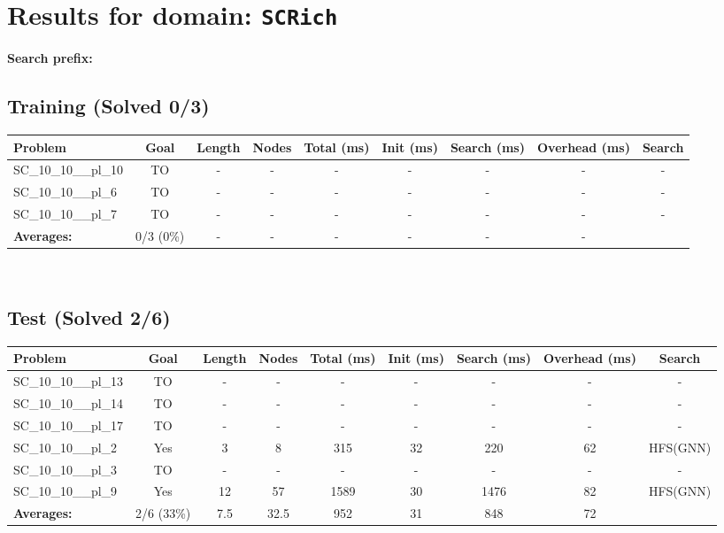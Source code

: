 \documentclass{article}
\begin{document}
\section*{Results for domain: \texttt{SCRich}}
\textbf{Search prefix:} 
\\[0.5cm]
\subsection*{Training (Solved 0/3)}
\begin{tabular}{lcccccccc}
\toprule
Problem & Goal & Length & Nodes & Total (ms) & Init (ms) & Search (ms) & Overhead (ms) & Search \\
\midrule
SC\_10\_10\_\_pl\_10 & TO & - & - & - & - & - & - & - \\
SC\_10\_10\_\_pl\_6 & TO & - & - & - & - & - & - & - \\
SC\_10\_10\_\_pl\_7 & TO & - & - & - & - & - & - & - \\
\textbf{Averages:} & 0/3 (0\%) & - & - & - & - & - & - & \\
\bottomrule
\end{tabular}
\\[0.7cm]
\subsection*{Test (Solved 2/6)}
\begin{tabular}{lcccccccc}
\toprule
Problem & Goal & Length & Nodes & Total (ms) & Init (ms) & Search (ms) & Overhead (ms) & Search \\
\midrule
SC\_10\_10\_\_pl\_13 & TO & - & - & - & - & - & - & - \\
SC\_10\_10\_\_pl\_14 & TO & - & - & - & - & - & - & - \\
SC\_10\_10\_\_pl\_17 & TO & - & - & - & - & - & - & - \\
SC\_10\_10\_\_pl\_2 & Yes & 3 & 8 & 315 & 32 & 220 & 62 & HFS(GNN) \\
SC\_10\_10\_\_pl\_3 & TO & - & - & - & - & - & - & - \\
SC\_10\_10\_\_pl\_9 & Yes & 12 & 57 & 1589 & 30 & 1476 & 82 & HFS(GNN) \\
\textbf{Averages:} & 2/6 (33\%) & 7.5 & 32.5 & 952 & 31 & 848 & 72 & \\
\bottomrule
\end{tabular}
\\[0.7cm]
\end{document}
